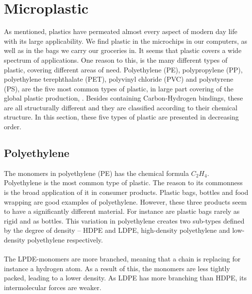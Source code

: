 \section{Microplastic} \label{sec:microplastic}
\noindent
As mentioned, plastics have permeated almost every aspect of modern day life with its large applicability. We find plastic in the microchips in our computers, as well as in the bags we carry our groceries in. It seems that plastic covers a wide spectrum of applications.  One reason to this, is the many different types of plastic, covering different areas of need. Polyethylene (PE), polypropylene (PP), polyethylene terephthalate (PET), polyvinyl chloride (PVC) and polystyrene (PS), are the five most common types of plastic, in large part covering of the global plastic production, \cite{johnson_2017}. Besides containing Carbon-Hydrogen bindings, these are all structurally different and they are classified according to their chemical structure. In this section, these five types of plastic are presented in decreasing order. 


\subsection{Polyethylene}
The monomers in polyethylene (PE) has the chemical formula $C_2H_4$. Polyethylene is the most common type of plastic. The reason to its commonness is the broad application of it in consumer products. Plastic bags, bottles and food wrapping are good examples of polyethylene. However, these three products seem to have a significantly different material. For instance are plastic bags rarely as rigid and as bottles. This variation in polyethylene creates two sub-types defined by the degree of density – HDPE and LDPE, high-density polyethylene and low-density polyethylene respectively.
\\\\
The LPDE-monomers are more branched, meaning that a chain is replacing for instance a hydrogen atom. As a result of this, the monomers are less tightly packed, leading to a lower density.  As LDPE has more branching than HDPE, its intermolecular forces are weaker.


